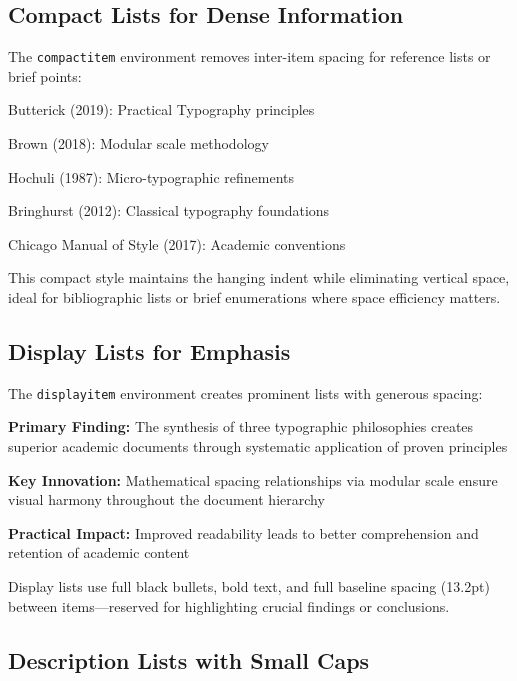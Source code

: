 \documentclass[11pt]{article}
\begin{document}
\subsection{Compact Lists for Dense Information}

The \texttt{compactitem} environment removes inter-item spacing for reference lists or brief points:

\begin{compactitem}
\item Butterick (2019): Practical Typography principles
\item Brown (2018): Modular scale methodology  
\item Hochuli (1987): Micro-typographic refinements
\item Bringhurst (2012): Classical typography foundations
\item Chicago Manual of Style (2017): Academic conventions
\end{compactitem}

This compact style maintains the hanging indent while eliminating vertical space, ideal for bibliographic lists or brief enumerations where space efficiency matters.

\subsection{Display Lists for Emphasis}

The \texttt{displayitem} environment creates prominent lists with generous spacing:

\begin{displayitem}
\item \textbf{Primary Finding:} The synthesis of three typographic philosophies creates superior academic documents through systematic application of proven principles
\item \textbf{Key Innovation:} Mathematical spacing relationships via modular scale ensure visual harmony throughout the document hierarchy
\item \textbf{Practical Impact:} Improved readability leads to better comprehension and retention of academic content
\end{displayitem}

Display lists use full black bullets, bold text, and full baseline spacing (13.2pt) between items—reserved for highlighting crucial findings or conclusions.

\subsection{Description Lists with Small Caps}
\end{document}
